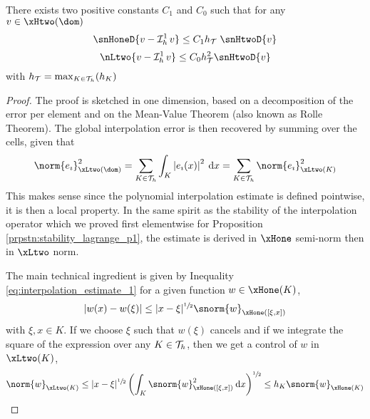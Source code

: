 \begin{prpstn}
There exists two positive constants $C_1$ and $C_0$ such that for any $v\in\xHtwo(\dom)$
\begin{equation}
\snHoneD{v - \Lgrh{1}v}  \leq C_1 \sizeT\;\snHtwoD{v}
\end{equation}
\begin{equation}
\nLtwo{v - \Lgrh{1}v}  \leq C_0 \sizeT^2 \snHtwoD{v}
\end{equation}
with $h_{\mathcal T} = \max_{K\in{\mathcal T}_h}(h_K)$
\end{prpstn}
\begin{proof}
The proof is sketched in one dimension, based on a decomposition of the error per element and on the Mean-Value Theorem (also known as Rolle Theorem).
The global interpolation error is then recovered by summing over the cells, given that
\begin{equation*}
\norm{e_\imath}^2_{\xLtwo(\dom)} = \sum_{K\in\meshT} \int_K\Abs{e_\imath(x)}^2 \md x = \sum_{K\in\meshT} \norm{e_\imath}^2_{\xLtwo(K)}
\end{equation*}
This makes sense since the polynomial interpolation estimate is defined pointwise, it is then a local property.
In the same spirit as the stability of the interpolation operator which we proved first elementwise for Proposition \ref{prpstn:stability_lagrange_p1}, the estimate is derived in $\xHone$ semi-norm then in $\xLtwo$ norm.

\medskip
The main technical ingredient is given by Inequality \eqref{eq:interpolation_estimate_1} for a given function $w\in\xHone(K)$,
\begin{equation}\label{eq:interpolation_estimate_trick_1}
\Abs{w(x) - w(\xi)} \leq \displaystyle|x - \xi|^{\sfrac{1}{2}}\snorm{w}_{\xHone([\xi, x])}
\end{equation}
with $\xi, x\in K$.
If we choose $\xi$ such that $w(\xi)$ cancels and if we integrate the square of the expression over any $K\in{\mathcal T}_h$, then we get a control of $w$ in $\xLtwo(K)$,
\begin{equation}\label{eq:interpolation_estimate_trick_2}
\norm{w}_{\xLtwo(K)} \leq \displaystyle|x - \xi|^{\sfrac{1}{2}}\left(\int_K \snorm{w}^2_{\xHone([\xi, x])}\md x\right)^{\sfrac{1}{2}} \leq h_K\snorm{w}_{\xHone(K)}
\end{equation}


\end{proof}
